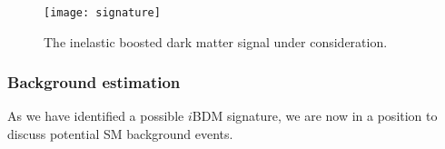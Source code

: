 \begin{figure}[t]
\centering
\texttt{[image: signature]}
\caption{\label{fig:sig} The inelastic boosted dark matter signal under consideration.}
\end{figure}



\subsubsection{Background estimation}

As we have identified a possible $i$BDM signature, we are now in a position to discuss potential SM background events. 

